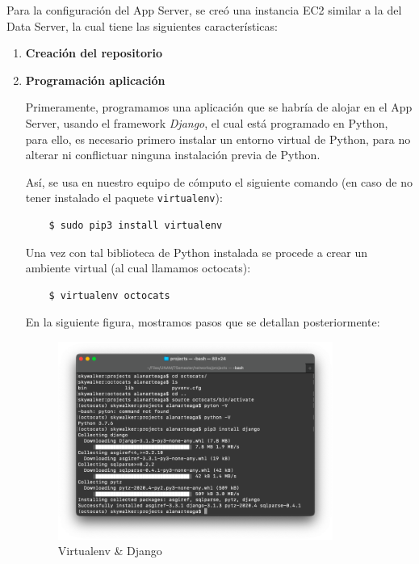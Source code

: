 \documentclass{article}
\begin{document}
Para la configuración del App Server, se creó una instancia EC2 similar
a la del Data Server, la cual tiene las siguientes características:

\begin{enumerate}

    \item {\bf Creación del repositorio}

    \item {\bf Programación aplicación}

    Primeramente, programamos una aplicación que se habría de alojar en el App
    Server, usando el framework {\it Django}, el cual está programado en
    Python, para ello, es necesario primero instalar un entorno virtual de
    Python, para no alterar ni conflictuar ninguna instalación previa de Python.

    Así, se usa en nuestro equipo de cómputo el siguiente comando (en caso de
    no tener instalado el paquete \texttt{virtualenv}):

    \begin{lstlisting}
    $ sudo pip3 install virtualenv
    \end{lstlisting}

    Una vez con tal biblioteca de Python instalada se procede a crear un
    ambiente virtual (al cual llamamos octocats):
    \begin{lstlisting}
    $ virtualenv octocats
    \end{lstlisting}

    En la siguiente figura, mostramos pasos que se detallan posteriormente:

    \begin{figure}[H]
      \centering
      \includegraphics[width=0.85\textwidth]{AppServer/f1}
      \caption{Virtualenv \& Django}
    \end{figure}


\end{enumerate}
\end{document}
